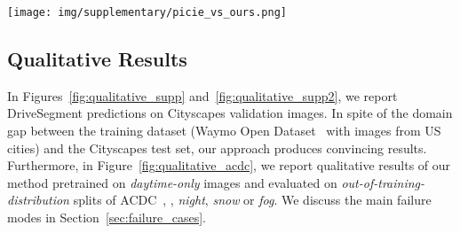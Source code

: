 \documentclass[runningheads]{llncs}
\newcommand{\ours}{DriveSegment\xspace}
\begin{document}
\begin{figure*}[t]
    \centering
    \texttt{[image: img/supplementary/picie\_vs\_ours.png]}
    \vspace{-4ex}
    \caption{\textbf{Qualitative comparison of PiCIE~\cite{cho2021picie}, IIC~\cite{ji2019invariant} and our \ours approach on PiCIE \emph{training} samples.} For a fair comparison, we use the same visualization procedure as in~\cite{cho2021picie}. 
    Results are shown on center-cropped Cityscapes training images. Note that our method is able to capture objects' contours much better and to segment categories such as \emph{person} that are not visible in IIC or PiCIE results.}
    \label{fig:ours_vs_picie_crops}
\end{figure*}


\subsection{Qualitative Results}
\label{sec:qual_ours}
In Figures~\ref{fig:qualitative_supp} and~\ref{fig:qualitative_supp2},
we report \ours predictions on Cityscapes validation images. In spite of the domain gap between the training dataset (Waymo Open Dataset~\cite{sun2020scalability} with images from US cities) and the Cityscapes test set, our approach produces convincing results. 
Furthermore, in Figure~\ref{fig:qualitative_acdc}, we report qualitative results of our method pretrained on \emph{daytime-only} images and evaluated on \emph{out-of-training-distribution} splits of ACDC~\cite{SDV21}, \eg, \emph{night}, \emph{snow} or \emph{fog}.
We discuss the main failure modes in  Section~\ref{sec:failure_cases}.
\end{document}
